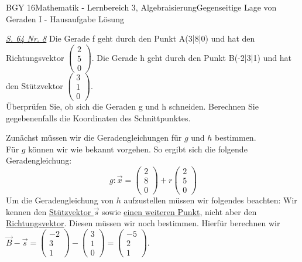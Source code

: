 \documentclass[oneside,openany,headings=optiontotoc,11pt,numbers=noenddot]{scrreprt}
\begin{document}
\begin{worksheet}{BGY 16}{Mathematik - Lernbereich 3, Algebraisierung}{Gegenseitige Lage von Geraden I - Hausaufgabe Lösung}
		\begin{framed}
			\noindent
			\underline{\textit{S. 64 Nr. 8}} Die Gerade f geht durch den Punkt A(3|8|0) und hat den Richtungsvektor \(\left(\begin{array}{c}2\\5\\0\end{array}\right)\). Die Gerade h geht durch den Punkt B(-2|3|1) und hat den Stützvektor \(\left(\begin{array}{c}3\\1\\0\end{array}\right)\).\\
			Überprüfen Sie, ob sich die Geraden g und h schneiden. Berechnen Sie gegebenenfalls die Koordinaten des Schnittpunktes.\\
			\par\noindent
			Zunächst müssen wir die Geradengleichungen für \(g\) und \(h\) bestimmen.\\
			Für \(g\) können wir wie bekannt vorgehen. So ergibt sich die folgende Geradengleichung:
			\[g: \vec{x} = \left(\begin{array}{c}2\\8\\0\end{array}\right) + r\left(\begin{array}{c}2\\5\\0\end{array}\right)\]
			Um die Geradengleichung von \(h\) aufzustellen müssen wir folgendes beachten: Wir kennen den \color{codegreen}\underline{Stützvektor \(\vec{s}\)}\normalcolor{} sowie \color{codegreen}\underline{einen weiteren Punkt}\normalcolor, nicht aber den \color{red}\underline{Richtungsvektor}\normalcolor. Diesen müssen wir noch bestimmen. \tiny{\color{codegray}Hierfür berechnen wir \(\vec{B} - \vec{s} = \left(\begin{array}{c}-2\\3\\1\end{array}\right) - \left(\begin{array}{c}3\\1\\0\end{array}\right) = \left(\begin{array}{c}-5\\2\\1\end{array}\right)\).}

\end{framed}
\end{worksheet}
\end{document}
